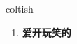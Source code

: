 
\begin{frame}
{\huge coltish}
\begin{center}
\begin{enumerate}\Large
  \item \textbf{爱开玩笑的}
\end{enumerate}
\end{center}
\end{frame}
